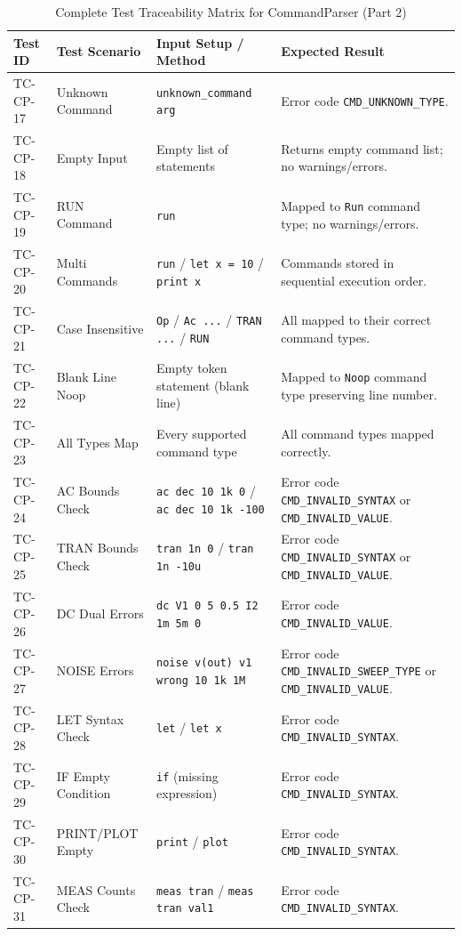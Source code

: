 \begin{table}[H]
\centering
\small
\begin{tabular}{|l|l|p{4.5cm}|p{4.5cm}|}
\hline
\textbf{Test ID} & \textbf{Test Scenario} & \textbf{Input Setup / Method} & \textbf{Expected Result} \\
\hline
TC-CP-17 & Unknown Command & \texttt{unknown\_command arg} & Error code \texttt{CMD\_UNKNOWN\_TYPE}. \\
\hline
TC-CP-18 & Empty Input & Empty list of statements & Returns empty command list; no warnings/errors. \\
\hline
TC-CP-19 & RUN Command & \texttt{run} & Mapped to \texttt{Run} command type; no warnings/errors. \\
\hline
TC-CP-20 & Multi Commands & \texttt{run} / \texttt{let x = 10} / \texttt{print x} & Commands stored in sequential execution order. \\
\hline
TC-CP-21 & Case Insensitive & \texttt{Op} / \texttt{Ac ...} / \texttt{TRAN ...} / \texttt{RUN} & All mapped to their correct command types. \\
\hline
TC-CP-22 & Blank Line Noop & Empty token statement (blank line) & Mapped to \texttt{Noop} command type preserving line number. \\
\hline
TC-CP-23 & All Types Map & Every supported command type & All command types mapped correctly. \\
\hline
TC-CP-24 & AC Bounds Check & \texttt{ac dec 10 1k 0} / \texttt{ac dec 10 1k -100} & Error code \texttt{CMD\_INVALID\_SYNTAX} or \texttt{CMD\_INVALID\_VALUE}. \\
\hline
TC-CP-25 & TRAN Bounds Check & \texttt{tran 1n 0} / \texttt{tran 1n -10u} & Error code \texttt{CMD\_INVALID\_SYNTAX} or \texttt{CMD\_INVALID\_VALUE}. \\
\hline
TC-CP-26 & DC Dual Errors & \texttt{dc V1 0 5 0.5 I2 1m 5m 0} & Error code \texttt{CMD\_INVALID\_VALUE}. \\
\hline
TC-CP-27 & NOISE Errors & \texttt{noise v(out) v1 wrong 10 1k 1M} & Error code \texttt{CMD\_INVALID\_SWEEP\_TYPE} or \texttt{CMD\_INVALID\_VALUE}. \\
\hline
TC-CP-28 & LET Syntax Check & \texttt{let} / \texttt{let x} & Error code \texttt{CMD\_INVALID\_SYNTAX}. \\
\hline
TC-CP-29 & IF Empty Condition & \texttt{if} (missing expression) & Error code \texttt{CMD\_INVALID\_SYNTAX}. \\
\hline
TC-CP-30 & PRINT/PLOT Empty & \texttt{print} / \texttt{plot} & Error code \texttt{CMD\_INVALID\_SYNTAX}. \\
\hline
TC-CP-31 & MEAS Counts Check & \texttt{meas tran} / \texttt{meas tran val1} & Error code \texttt{CMD\_INVALID\_SYNTAX}. \\
\hline
\end{tabular}
\caption{Complete Test Traceability Matrix for CommandParser (Part 2)}
\end{table}


